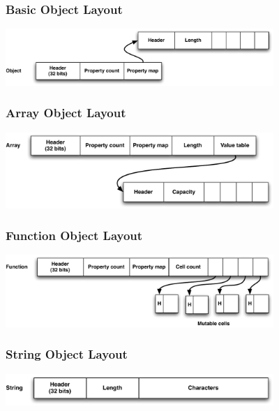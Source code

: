 \begin{frame}
\frametitle{\bf Basic Object Layout}

\begin{center}
\includegraphics[width=4in]{images/obj_layout_basic}
\end{center}
\end{frame}

\begin{frame}
\frametitle{\bf Array Object Layout}

\begin{center}
\includegraphics[width=4in]{images/obj_layout_array}
\end{center}
\end{frame}

\begin{frame}
\frametitle{\bf Function Object Layout}

\begin{center}
\includegraphics[width=4in]{images/obj_layout_func}
\end{center}
\end{frame}

\begin{frame}
\frametitle{\bf String Object Layout}

\begin{center}
\includegraphics[width=4in]{images/obj_layout_str}
\end{center}
\end{frame}

